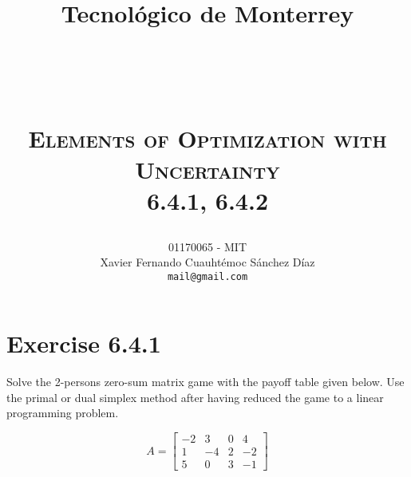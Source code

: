 \documentclass[titlepage, letterpaper, fleqn]{article}
\title{
\vspace{1in}
\textbf{Tecnológico de Monterrey} \\
\vspace{0.5in}
\textmd{\mahclass} \\
\large{\textit{\mahteacher}} \\
\vspace{0.5in}
\textsc{\mahtitle}\\
\textsc{Elements of Optimization with Uncertainty}\\
\textsc{6.4.1, 6.4.2}\\
\author{01170065  - MIT \\
Xavier Fernando Cuauhtémoc Sánchez Díaz \\
\texttt{mail@gmail.com}}
\date{\mahdate}
}
\begin{document}
\begin{titlepage}
\maketitle
\end{titlepage}

%
%

\section{Exercise 6.4.1}

{\large Solve the 2-persons zero-sum matrix game with the payoff table given below.
Use the primal or dual simplex method after having reduced the game to a linear programming problem.

$$A =
\begin{bmatrix}
-2 & 3 & 0 & 4 \\
1 & -4 & 2 & -2 \\
5 & 0 & 3 & -1
\end{bmatrix}$$}
\end{document}
